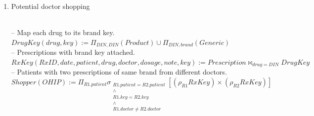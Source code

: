 \documentclass{article}
\newcommand{\var}[1]{\mathit{#1}}
\begin{document}
\begin{enumerate}
{-- Allowed drugs are cheapest generics or brand drugs with no generics. \\[5pt]
$
AllowedDIN(\var{DIN}) :=
  CheapestGen \cup BrandNoGen
$ \\[10pt]

-- Prescriptions involving priced drugs. \\[5pt]
$
RxPriced(\var{RxID}, \var{date}, \var{patient}, \var{drug}, \var{doctor}, \var{dosage}, \var{note}) :=
  \var{Prescription} \bowtie_{\var{drug} = \var{DIN}} PricedDIN
$ \\[10pt]

-- Doctors who prescribed a disallowed drug. \\[5pt]
$
BadDoctor(\var{doctor}) :=
  \Pi_{\var{doctor}}
  (\sigma_{\neg(\var{drug} = \var{DIN})}
   (RxPriced \times AllowedDIN))
$ \\[10pt]

-- Doctors who prescribed at least two different priced drugs. \\[5pt]
$
TwoDrugs(\var{doctor}) :=
  \Pi_{P1.\var{doctor}}
  \sigma_{\substack{
    P1.\var{doctor} = P2.\var{doctor} \\
    \wedge \\
    P1.\var{drug} \neq P2.\var{drug}
  }}
  [ (\rho_{P1}RxPriced) \times (\rho_{P2}RxPriced) ]
$ \\[10pt]

-- Final answer. \\[5pt]
$
Answer(\var{doctor}) :=
  TwoDrugs - BadDoctor
$
}

\item {\large Potential doctor shopping}

{~}\\
{\large
-- Map each drug to its brand key. \\[5pt]
$
DrugKey(\var{drug}, \var{key}) :=
  \Pi_{\var{DIN}, \var{DIN}}(\var{Product})
  \cup
  \Pi_{\var{DIN}, \var{brand}}(\var{Generic})
$ \\[10pt]

-- Prescriptions with brand key attached. \\[5pt]
$
RxKey(\var{RxID}, \var{date}, \var{patient}, \var{drug}, \var{doctor}, \var{dosage}, \var{note}, \var{key}) :=
  \var{Prescription} \bowtie_{\var{drug} = \var{DIN}} DrugKey
$ \\[10pt]

-- Patients with two prescriptions of same brand from different doctors. \\[5pt]
$
Shopper(\var{OHIP}) :=
  \Pi_{R1.\var{patient}}
  \sigma_{\substack{
    R1.\var{patient} = R2.\var{patient} \\
    \wedge \\
    R1.\var{key} = R2.\var{key} \\
    \wedge \\
    R1.\var{doctor} \neq R2.\var{doctor}
  }}
  [ (\rho_{R1}RxKey) \times (\rho_{R2}RxKey) ]
$ \\[10pt]

}
\end{enumerate}
\end{document}
